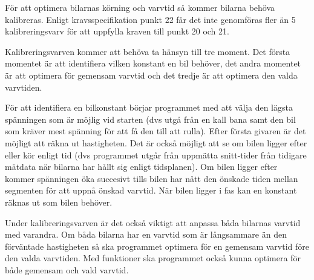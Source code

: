 För att optimera bilarnas körning och varvtid så kommer bilarna behöva
kalibreras. Enligt kravsspecifikation punkt 22 får det inte genomföras fler än
5 kalibreringsvarv för att uppfylla kraven till punkt 20 och 21.

Kalibreringsvarven kommer att behöva ta hänsyn till tre moment. Det första momentet är att
identifiera vilken konstant en bil behöver, det andra momentet är att optimera för
gemensam varvtid och det tredje är att optimera den valda varvtiden.


För att identifiera en bilkonstant börjar programmet med att välja den lägsta spänningen som är möjlig vid starten (dvs utgå från en kall bana samt den bil som kräver mest spänning för att få den till att rulla). Efter första givaren är det möjligt att räkna ut hastigheten. Det är också möjligt att se om bilen ligger efter eller kör enligt tid (dvs programmet utgår från uppmätta snitt-tider från tidigare mätdata när bilarna har hållt sig enligt tidsplanen). Om bilen ligger efter kommer spänningen öka succesivt tills bilen har nått den önskade tiden mellan segmenten för att uppnå önskad varvtid. När bilen ligger i fas kan en konstant räknas ut som bilen behöver. 

Under
kalibreringsvarven är det också viktigt att anpassa båda bilarnas varvtid med
varandra. Om båda bilarna har en varvtid som är långsammare än den förväntade
hastigheten så ska programmet optimera för en gemensam varvtid före den valda
varvtiden. Med funktioner ska programmet också kunna optimera för både
gemensam och vald varvtid.

